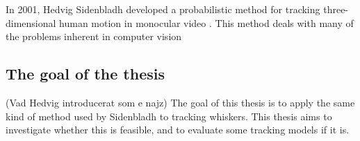 In 2001, Hedvig Sidenbladh developed a probabilistic method for tracking three-dimensional human motion in monocular video \cite{Hedvig}. This method deals with many of the problems inherent in computer vision

\subsection{The goal of the thesis}

(Vad Hedvig introducerat som e najz) The goal of this thesis is to apply the same kind of method used by Sidenbladh to tracking whiskers. This thesis aims to investigate whether this is feasible, and to evaluate some tracking models if it is.


